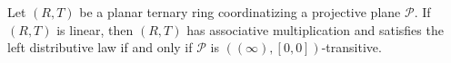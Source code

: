 Let $(R, T)$ be a planar ternary ring coordinatizing a projective plane $\mathcal{P}$. If $(R, T)$ is linear, then $(R, T)$ has associative multiplication and satisfies the left distributive law if and only if $\mathcal{P}$ is $((\infty), [0, 0])$-transitive.
